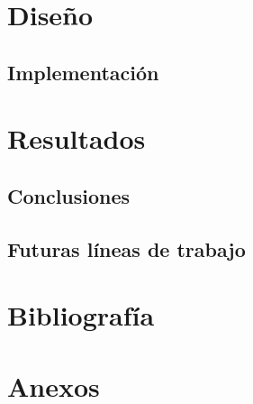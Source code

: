 \cleardoublepage

\section{Diseño}
\subsection{Implementación}

\cleardoublepage

\section{Resultados}
\subsection{Conclusiones}
\subsection{Futuras líneas de trabajo}

\cleardoublepage

\section{Bibliografía}
\printbibliography[heading=none]

\cleardoublepage

\section{Anexos}